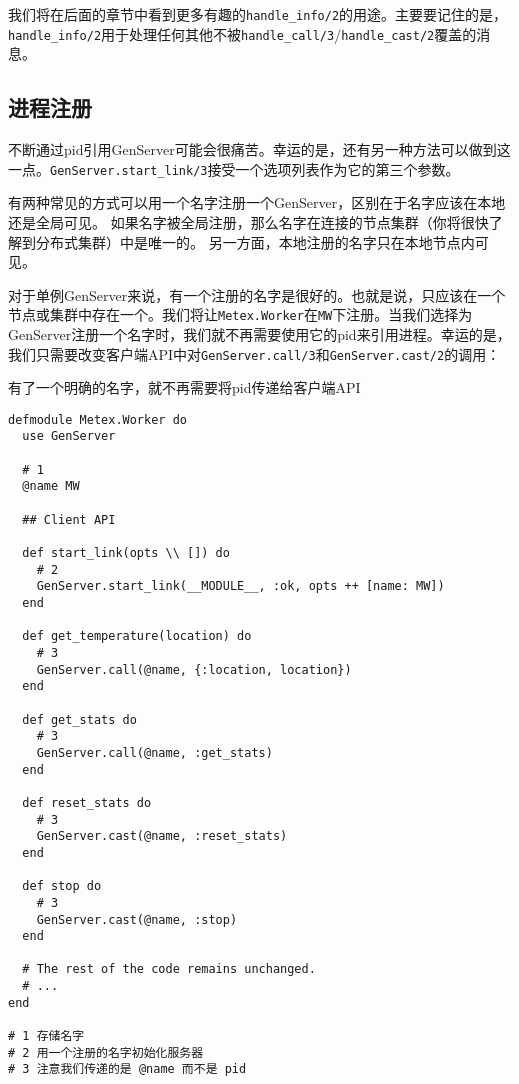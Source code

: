 我们将在后面的章节中看到更多有趣的\texttt{handle\_info/2}的用途。主要要记住的是，\texttt{handle\_info/2}用于处理任何其他不被\texttt{handle\_call/3}/\texttt{handle\_cast/2}覆盖的消息。

 \subsection{进程注册}

不断通过pid引用GenServer可能会很痛苦。幸运的是，还有另一种方法可以做到这一点。\texttt{GenServer.start\_link/3}接受一个选项列表作为它的第三个参数。

有两种常见的方式可以用一个名字注册一个GenServer，区别在于名字应该在本地还是全局可见。
如果名字被全局注册，那么名字在连接的节点集群（你将很快了解到分布式集群）中是唯一的。
另一方面，本地注册的名字只在本地节点内可见。

对于单例GenServer来说，有一个注册的名字是很好的。也就是说，只应该在一个节点或集群中存在一个。我们将让\texttt{Metex.Worker}在\texttt{MW}下注册。当我们选择为GenServer注册一个名字时，我们就不再需要使用它的pid来引用进程。幸运的是，我们只需要改变客户端API中对\texttt{GenServer.call/3}和\texttt{GenServer.cast/2}的调用：

\begin{code}{有了一个明确的名字，就不再需要将pid传递给客户端API}
\begin{verbatim}
defmodule Metex.Worker do
  use GenServer

  # 1
  @name MW

  ## Client API

  def start_link(opts \\ []) do
    # 2
    GenServer.start_link(__MODULE__, :ok, opts ++ [name: MW])
  end

  def get_temperature(location) do
    # 3
    GenServer.call(@name, {:location, location})
  end

  def get_stats do
    # 3
    GenServer.call(@name, :get_stats)
  end

  def reset_stats do
    # 3
    GenServer.cast(@name, :reset_stats)
  end

  def stop do
    # 3
    GenServer.cast(@name, :stop)
  end

  # The rest of the code remains unchanged.
  # ...
end

# 1 存储名字
# 2 用一个注册的名字初始化服务器
# 3 注意我们传递的是 @name 而不是 pid
\end{verbatim}
\label{lst:with_a_named_server_we_no_longer_need_to_pass_pids_to_the_client_api}
\end{code}


